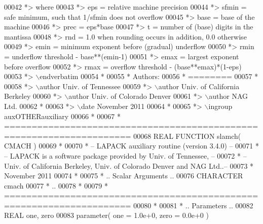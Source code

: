 \begin{DoxyCode}
00042 \textcolor{comment}{*>          where}
00043 \textcolor{comment}{*>          eps   = relative machine precision}
00044 \textcolor{comment}{*>          sfmin = safe minimum, such that 1/sfmin does not overflow}
00045 \textcolor{comment}{*>          base  = base of the machine}
00046 \textcolor{comment}{*>          prec  = eps*base}
00047 \textcolor{comment}{*>          t     = number of (base) digits in the mantissa}
00048 \textcolor{comment}{*>          rnd   = 1.0 when rounding occurs in addition, 0.0 otherwise}
00049 \textcolor{comment}{*>          emin  = minimum exponent before (gradual) underflow}
00050 \textcolor{comment}{*>          rmin  = underflow threshold - base**(emin-1)}
00051 \textcolor{comment}{*>          emax  = largest exponent before overflow}
00052 \textcolor{comment}{*>          rmax  = overflow threshold  - (base**emax)*(1-eps)}
00053 \textcolor{comment}{*> \(\backslash\)endverbatim}
00054 \textcolor{comment}{*}
00055 \textcolor{comment}{*  Authors:}
00056 \textcolor{comment}{*  ========}
00057 \textcolor{comment}{*}
00058 \textcolor{comment}{*> \(\backslash\)author Univ. of Tennessee }
00059 \textcolor{comment}{*> \(\backslash\)author Univ. of California Berkeley }
00060 \textcolor{comment}{*> \(\backslash\)author Univ. of Colorado Denver }
00061 \textcolor{comment}{*> \(\backslash\)author NAG Ltd. }
00062 \textcolor{comment}{*}
00063 \textcolor{comment}{*> \(\backslash\)date November 2011}
00064 \textcolor{comment}{*}
00065 \textcolor{comment}{*> \(\backslash\)ingroup auxOTHERauxiliary}
00066 \textcolor{comment}{*}
00067 \textcolor{comment}{*  =====================================================================}
00068 \textcolor{keyword}{      REAL             }\textcolor{keyword}{FUNCTION }slamch( CMACH )
00069 \textcolor{comment}{*}
00070 \textcolor{comment}{*  -- LAPACK auxiliary routine (version 3.4.0) --}
00071 \textcolor{comment}{*  -- LAPACK is a software package provided by Univ. of Tennessee,    --}
00072 \textcolor{comment}{*  -- Univ. of California Berkeley, Univ. of Colorado Denver and NAG Ltd..--}
00073 \textcolor{comment}{*     November 2011}
00074 \textcolor{comment}{*}
00075 \textcolor{comment}{*     .. Scalar Arguments ..}
00076       \textcolor{keywordtype}{CHARACTER}          cmach
00077 \textcolor{comment}{*     ..}
00078 \textcolor{comment}{*}
00079 \textcolor{comment}{* =====================================================================}
00080 \textcolor{comment}{*}
00081 \textcolor{comment}{*     .. Parameters ..}
00082       \textcolor{keywordtype}{REAL}               one, zero
00083       parameter( one = 1.0e+0, zero = 0.0e+0 )

\end{DoxyCode}
